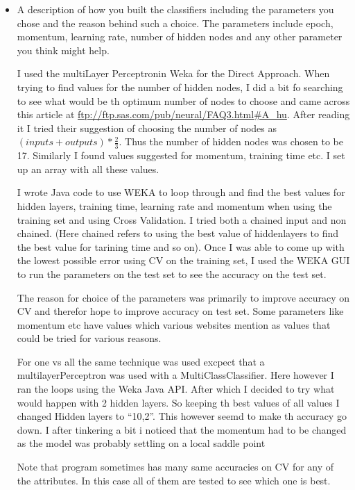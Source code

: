 \documentclass[fontsize=10pt,DIV=14]{scrartcl}
\begin{document}
	\begin{itemize}
		\item
		A description of how you built the classiﬁers including the parameters you chose and the reason behind such a choice. The parameters include epoch, momentum, learning rate, number of hidden nodes and any other parameter you think might help.

		I used the multiLayer Perceptronin Weka for the Direct Approach. When trying to find values for the number of hidden nodes, I did a bit fo searching to see what would be th optimum number of nodes to choose and came across this article at \url{ftp://ftp.sas.com/pub/neural/FAQ3.html#A_hu}. After reading it I tried their suggestion of choosing the number of nodes as $( inputs + outputs) * \frac{2}{3}$. Thus the number of hidden nodes was chosen to be 17.
		Similarly I found values suggested for momentum, training time etc. I set up an array with all these values.

		I wrote Java code to use WEKA to loop through and find the best values for hidden layers, training time, learning rate and momentum when using the training set and using Cross Validation. I tried both a chained input and non chained. (Here chained refers to using the best value of hiddenlayers to find the best value for tarining time and so on). Once I was able to come up with the lowest possible error using CV on the training set, I used the WEKA GUI to run the parameters on the test set to see the accuracy on the test set.

		The reason for choice of the parameters was primarily to improve accuracy on CV and therefor hope to improve accuracy on test set. Some parameters like momentum etc have values which various websites mention as values that could be tried for various reasons.

		For one vs all the same technique was used excpect that a multilayerPerceptron was used with a MultiClassClassifier. Here however I ran the loops using the Weka Java API. After which I decided to try what would happen with 2 hidden layers. So keeping th best values of all values I changed Hidden layers to ``10,2''. This however seemd to make th accuracy go down. I after tinkering a bit i noticed that the momentum had to be changed as the model was probably settling on a local saddle point

		Note that program sometimes has many same accuracies on CV for any of the attributes. In this case all of them are tested to see which one is best.


\end{itemize}
\end{document}
